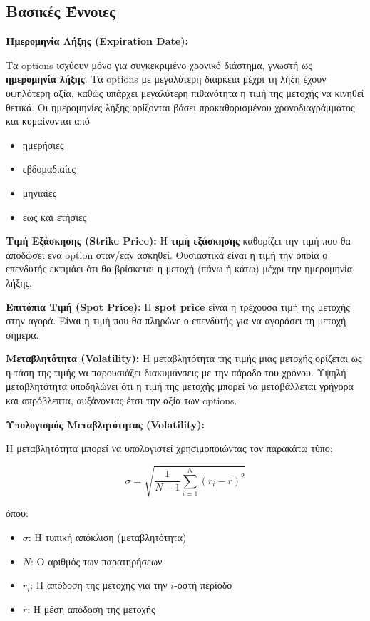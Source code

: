 \subsection{Βασικές Έννοιες}

\textbf{Ημερομηνία Λήξης (Expiration Date):}

Τα options ισχύουν μόνο για συγκεκριμένο χρονικό διάστημα, γνωστή ως \textbf{ημερομηνία λήξης}. 
Τα options με μεγαλύτερη διάρκεια μέχρι τη λήξη έχουν υψηλότερη αξία, καθώς υπάρχει μεγαλύτερη πιθανότητα η τιμή της μετοχής να κινηθεί θετικά.
Οι ημερομηνίες λήξης ορίζονται βάσει προκαθορισμένου χρονοδιαγράμματος και κυμαίνονται από
\begin{itemize}
    \item ημερήσιες
    \item εβδομαδιαίες
    \item μηνιαίες
    \item εως και ετήσιες
\end{itemize}

\textbf{Τιμή Εξάσκησης (Strike Price):}
Η \textbf{τιμή εξάσκησης} καθορίζει την τιμή που θα αποδώσει ενα option οταν/εαν ασκηθεί. Ουσιαστικά είναι η τιμή την οποία ο επενδυτής εκτιμάει ότι θα βρίσκεται η μετοχή (πάνω ή κάτω) μέχρι την ημερομηνία λήξης.

\textbf{Επιτόπια Τιμή (Spot Price):}
Η \textbf{spot price} είναι η τρέχουσα τιμή της μετοχής στην αγορά. Είναι η τιμή που θα πληρώνε ο επενδυτής για να αγοράσει τη μετοχή σήμερα.

\textbf{Μεταβλητότητα (Volatility):}
Η μεταβλητότητα της τιμής μιας μετοχής ορίζεται ως η τάση της τιμής να παρουσιάζει διακυμάνσεις με την πάροδο του χρόνου. Υψηλή μεταβλητότητα υποδηλώνει ότι η τιμή της μετοχής μπορεί να μεταβάλλεται γρήγορα και απρόβλεπτα, αυξάνοντας έτσι την αξία των options.

\textbf{Υπολογισμός Μεταβλητότητας (Volatility):}

Η μεταβλητότητα μπορεί να υπολογιστεί χρησιμοποιώντας τον παρακάτω τύπο:

\begin{equation}
    \sigma = \sqrt{\frac{1}{N-1} \sum_{i=1}^{N} (r_i - \bar{r})^2}
\end{equation}

όπου:
\begin{itemize}
    \item $\sigma$: Η τυπική απόκλιση (μεταβλητότητα)
    \item $N$: Ο αριθμός των παρατηρήσεων
    \item $r_i$: Η απόδοση της μετοχής για την $i$-οστή περίοδο
    \item $\bar{r}$: Η μέση απόδοση της μετοχής
\end{itemize}


